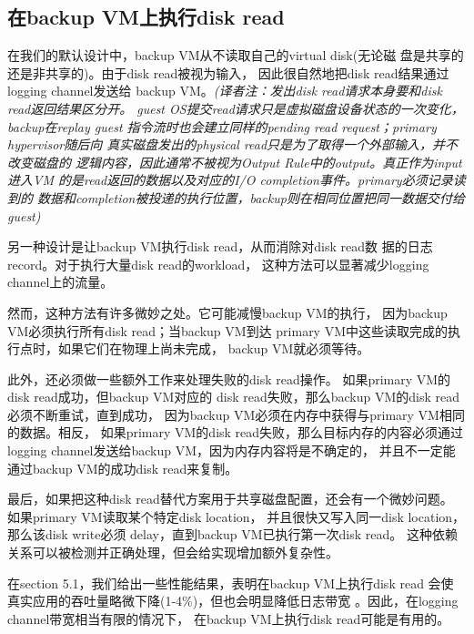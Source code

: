 \subsection{在backup VM上执行disk read}

在我们的默认设计中，backup VM从不读取自己的virtual disk(无论磁%
盘是共享的还是非共享的)。由于disk read被视为输入，%
因此很自然地把disk read结果通过logging channel发送给%
backup VM。\emph{(译者注：发出disk read请求本身要和disk read返回结果区分开。%
guest OS提交read请求只是虚拟磁盘设备状态的一次变化，backup在replay guest%
指令流时也会建立同样的pending read request；primary hypervisor随后向%
真实磁盘发出的physical read只是为了取得一个外部输入，并不改变磁盘的%
逻辑内容，因此通常不被视为Output Rule中的output。真正作为input进入VM%
的是read返回的数据以及对应的I/O completion事件。primary必须记录读到的%
数据和completion被投递的执行位置，backup则在相同位置把同一数据交付给%
guest)}%

另一种设计是让backup VM执行disk read，从而消除对disk read数%
据的日志record。对于执行大量disk read的workload，%
这种方法可以显著减少logging channel上的流量。%

然而，这种方法有许多微妙之处。它可能减慢backup VM的执行，%
因为backup VM必须执行所有disk read；当backup VM到达%
primary VM中这些读取完成的执行点时，如果它们在物理上尚未完成，%
backup VM就必须等待。%

此外，还必须做一些额外工作来处理失败的disk read操作。%
如果primary VM的disk read成功，但backup VM对应的%
disk read失败，那么backup VM的disk read必须不断重试，直到成功，%
因为backup VM必须在内存中获得与primary VM相同的数据。相反，%
如果primary VM的disk read失败，那么目标内存的内容必须通过%
logging channel发送给backup VM，因为内存内容将是不确定的，%
并且不一定能通过backup VM的成功disk read来复制。%

最后，如果把这种disk read替代方案用于共享磁盘配置，还会有一个微妙问题。%
如果primary VM读取某个特定disk location，%
并且很快又写入同一disk location，那么该disk write必须%
delay，直到backup VM已执行第一次disk read。%
这种依赖关系可以被检测并正确处理，但会给实现增加额外复杂性。%

在section 5.1，我们给出一些性能结果，表明在backup VM上执行disk read%
会使真实应用的吞吐量略微下降(1-4\%)，但也会明显降低日志带宽%
。因此，在logging channel带宽相当有限的情况下，%
在backup VM上执行disk read可能是有用的。
